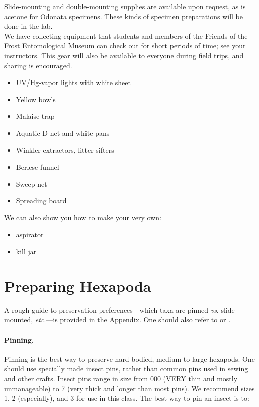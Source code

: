 \documentclass[letterpaper, 11pt]{article}
\begin{document}
\noindent{}Slide-mounting and double-mounting supplies are available upon request, as is acetone for Odonata specimens. These kinds of specimen preparations will be done in the lab.\\

\noindent{}We have collecting equipment that students and members of the Friends of the Frost Entomological Museum can check out for short periods of time; see your instructors. This gear will also be available to everyone during field trips, and sharing is encouraged.

\begin{itemize}
\item UV/Hg-vapor lights with white sheet
\item Yellow bowls
\item Malaise trap
\item Aquatic D net and white pans
\item Winkler extractors, litter sifters
\item Berlese funnel
\item Sweep net
\item Spreading board
\end{itemize}

\noindent{}We can also show you how to make your very own:
 
\begin{itemize}
\item aspirator
\item kill jar
\end{itemize}

\section*{Preparing Hexapoda}
A rough guide to preservation preferences---which taxa are pinned \textit{vs}. slide-mounted, \textit{etc}.---is provided in the Appendix. One should also refer to \cite{USDAmanual} or \cite{USDAmanual1986}.

\paragraph*{Pinning.} Pinning is the best way to preserve hard-bodied, medium to large hexapods. One should use specially made insect pins, rather than common pins used in sewing and other crafts. Insect pins range in size from 000 (VERY thin and mostly unmanageable) to 7 (very thick and longer than most pins). We recommend sizes 1, 2 (especially), and 3 for use in this class. The best way to pin an insect is to:
 
\end{document}
